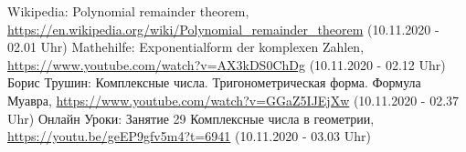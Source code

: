 \documentclass[a4paper,12pt]{article} %
\begin{document}
\renewcommand{\refname}{Internetquellen}  %

\begin{thebibliography}{9}
	 Wikipedia: Polynomial remainder theorem, \url{https://en.wikipedia.org/wiki/Polynomial_remainder_theorem} (10.11.2020 - 02.01 Uhr)
	 Mathehilfe: Exponentialform der komplexen Zahlen, \url{https://www.youtube.com/watch?v=AX3kDS0ChDg} (10.11.2020 - 02.12 Uhr)
	 Борис Трушин: Комплексные числа. Тригонометрическая форма. Формула Муавра, \url{https://www.youtube.com/watch?v=GGaZ5IJEjXw} (10.11.2020 - 02.37 Uhr)
	 Онлайн Уроки: Занятие 29 Комплексные числа в геометрии, \url{https://youtu.be/geEP9gfv5m4?t=6941} (10.11.2020 - 03.03 Uhr)
\end{thebibliography}
\end{document}
